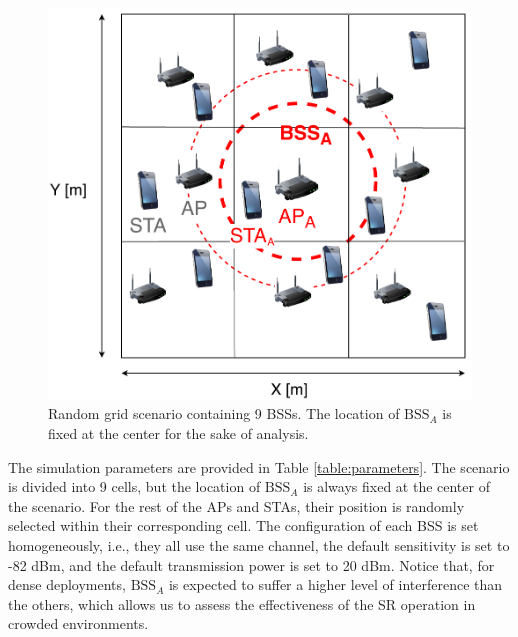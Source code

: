 \documentclass{ieeeaccess}
\begin{document}
\begin{figure}[ht!]
	\centering
	\includegraphics[width=0.8\columnwidth]{random_scenario}
	\caption{Random grid scenario containing 9 BSSs. The location of $\text{BSS}_A$ is fixed at the center for the sake of analysis.}
	\label{fig:random_scenario}
\end{figure}

The simulation parameters are provided in Table \ref{table:parameters}. The scenario is divided into 9 cells, but the location of $\text{BSS}_A$ is always fixed at the center of the scenario. For the rest of the APs and STAs, their position is randomly selected within their corresponding cell. The configuration of each BSS is set homogeneously, i.e., they all use the same channel, the default sensitivity is set to -82 dBm, and the default transmission power is set to 20 dBm. Notice that, for dense deployments, $\text{BSS}_A$ is expected to suffer a higher level of interference than the others, which allows us to assess the effectiveness of the SR operation in crowded environments.
\end{document}

